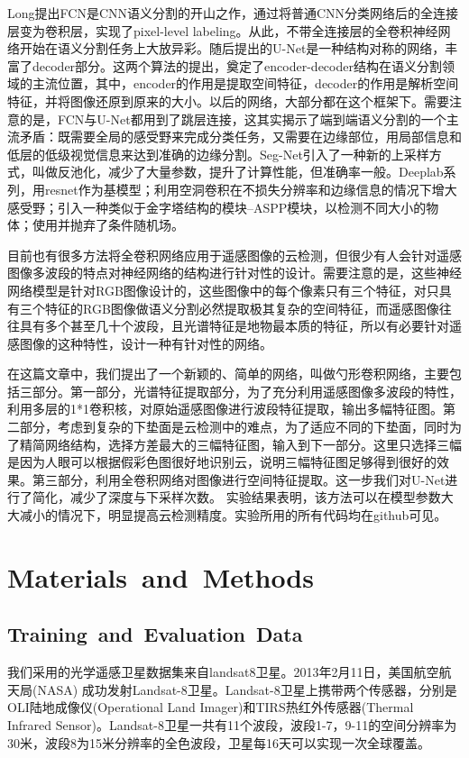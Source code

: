 \documentclass[UTF8]{ctexart}
\begin{document}
Long提出FCN\cite{FCN}是CNN语义分割的开山之作，通过将普通CNN分类网络后的全连接层变为卷积层，实现了pixel-level labeling。从此，不带全连接层的全卷积神经网络开始在语义分割任务上大放异彩。随后提出的U-Net\cite{ronneberger2015unet}是一种结构对称的网络，丰富了decoder部分。这两个算法的提出，奠定了encoder-decoder结构在语义分割领域的主流位置，其中，encoder的作用是提取空间特征，decoder的作用是解析空间特征，并将图像还原到原来的大小。以后的网络，大部分都在这个框架下。需要注意的是，FCN与U-Net都用到了跳层连接，这其实揭示了端到端语义分割的一个主流矛盾：既需要全局的感受野来完成分类任务，又需要在边缘部位，用局部信息和低层的低级视觉信息来达到准确的边缘分割。Seg-Net\cite{badrinarayanan2015segnet}引入了一种新的上采样方式，叫做反池化，减少了大量参数，提升了计算性能，但准确率一般。Deeplab\cite{chen2014semantic, chen2017deeplab, chen2017rethinking}系列，用resnet作为基模型；利用空洞卷积在不损失分辨率和边缘信息的情况下增大感受野；引入一种类似于金字塔结构的模块--ASPP模块，以检测不同大小的物体；使用并抛弃了条件随机场。

目前也有很多方法将全卷积网络应用于遥感图像的云检测\cite{chai2019cloud, jeppesen2019cloud}，但很少有人会针对遥感图像多波段的特点对神经网络的结构进行针对性的设计。需要注意的是，这些神经网络模型是针对RGB图像设计的，这些图像中的每个像素只有三个特征，对只具有三个特征的RGB图像做语义分割必然提取极其复杂的空间特征，而遥感图像往往具有多个甚至几十个波段，且光谱特征是地物最本质的特征，所以有必要针对遥感图像的这种特性，设计一种有针对性的网络。

在这篇文章中，我们提出了一个新颖的、简单的网络，叫做勺形卷积网络，主要包括三部分。第一部分，光谱特征提取部分，为了充分利用遥感图像多波段的特性，利用多层的1*1卷积核，对原始遥感图像进行波段特征提取，输出多幅特征图。第二部分，考虑到复杂的下垫面是云检测中的难点，为了适应不同的下垫面，同时为了精简网络结构，选择方差最大的三幅特征图，输入到下一部分。这里只选择三幅是因为人眼可以根据假彩色图很好地识别云，说明三幅特征图足够得到很好的效果。第三部分，利用全卷积网络对图像进行空间特征提取。这一步我们对U-Net进行了简化，减少了深度与下采样次数。
实验结果表明，该方法可以在模型参数大大减小的情况下，明显提高云检测精度。实验所用的所有代码均在github可见。

\section[]{Materials and Methods}
\subsection{Training and Evaluation Data}
我们采用的光学遥感卫星数据集来自landsat8卫星。2013年2月11日，美国航空航天局(NASA) 成功发射Landsat-8卫星。Landsat-8卫星上携带两个传感器，分别是OLI陆地成像仪(Operational Land Imager)和TIRS热红外传感器(Thermal Infrared Sensor)。Landsat-8卫星一共有11个波段，波段1-7，9-11的空间分辨率为30米，波段8为15米分辨率的全色波段，卫星每16天可以实现一次全球覆盖。
\end{document}

